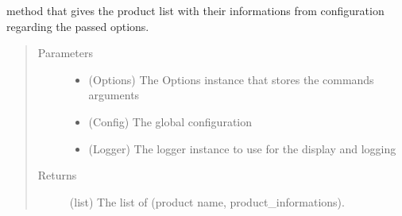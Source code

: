 \documentclass[a4paper,10pt,english]{sphinxmanual}
\begin{document}

\begin{fulllineitems}
\label{\detokenize{apidoc_commands/commands:commands.makeinstall.get_products_list}}
method that gives the product list with their informations from 
configuration regarding the passed options.
\begin{quote}\begin{description}
\item[{Parameters}] \leavevmode\begin{itemize}
\item {} 
 \textendash{} (Options) 
The Options instance that stores the commands arguments

\item {} 
 \textendash{} (Config) The global configuration

\item {} 
 \textendash{} (Logger) 
The logger instance to use for the display and logging

\end{itemize}

\item[{Returns}] \leavevmode
(list) The list of (product name, product\_informations).

\end{description}\end{quote}

\end{fulllineitems}

\end{document}
